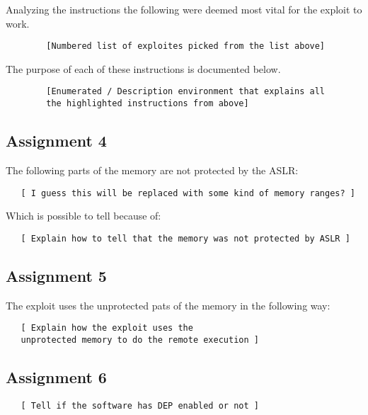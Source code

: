 \documentclass[10pt]{article}
\begin{document}
      Analyzing the instructions the following were deemed most vital for the
      exploit to work.

      \begin{verbatim}
        [Numbered list of exploites picked from the list above]
      \end{verbatim}

      The purpose of each of these instructions is documented below.

      \begin{verbatim}
        [Enumerated / Description environment that explains all
        the highlighted instructions from above]
      \end{verbatim}


    \subsection{Assignment 4}

      The following parts of the memory are not protected by the ASLR:

      \begin{verbatim}
   [ I guess this will be replaced with some kind of memory ranges? ]
      \end{verbatim}

      Which is possible to tell because of:

      \begin{verbatim}
   [ Explain how to tell that the memory was not protected by ASLR ]
      \end{verbatim}

    \subsection{Assignment 5}

      The exploit uses the unprotected pats of the memory in the following way:

      \begin{verbatim}
   [ Explain how the exploit uses the
   unprotected memory to do the remote execution ]
      \end{verbatim}

    \subsection{Assignment 6}

      \begin{verbatim}
   [ Tell if the software has DEP enabled or not ]
      \end{verbatim}
\end{document}
